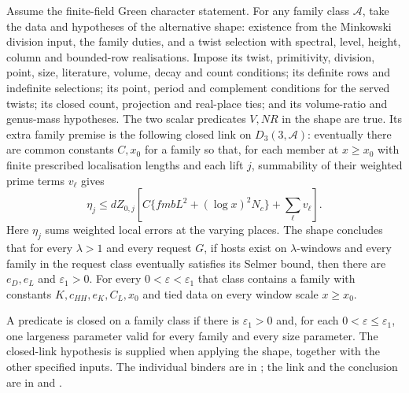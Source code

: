 \begin{formalstatement}\label{sub:B05}
Assume the finite-field Green character statement. For any family class
$\mathcal A$, take the data and hypotheses of the alternative shape:
existence from the Minkowski division input, the family duties, and a
twist selection with spectral, level, height, column and bounded-row
realisations. Impose its twist, primitivity, division, point, size,
literature, volume, decay and count conditions; its definite rows and
indefinite selections; its point, period and complement conditions for
the served twists; its closed count, projection and real-place ties;
and its volume-ratio and genus-mass hypotheses. The two scalar predicates
$V,NR$ in the shape are true. Its extra family premise is the following
closed link on $D_3(3,\mathcal A)$: eventually there are common constants
$C,x_0$ for a family so that, for each member at $x\ge x_0$ with finite
prescribed localisation lengths and each lift $j$, summability of their
weighted prime terms $v_\ell$ gives
\[
  \eta_j\le dZ_{0,j}\left[C\{fmbL^2+(\log x)^2N_c\}
                         +\sum_\ell v_\ell\right].
\]
Here $\eta_j$ sums weighted local errors at the varying places. The shape
concludes that for every $\lambda>1$ and every request $G$, if hosts exist
on $\lambda$-windows and every family in the request class eventually
satisfies its Selmer bound, then there are $e_D,e_L$ and $\varepsilon_1>0$.
For every $0<\varepsilon<\varepsilon_1$ that class contains a family
with constants $K,c_{HH},e_K,C_L,x_0$ and tied data on every window scale
$x\ge x_0$.
\end{formalstatement}
A predicate is closed on a family class if there is $\varepsilon_1>0$
and, for each $0<\varepsilon\le\varepsilon_1$, one largeness parameter
valid for every family and every size parameter. The closed-link hypothesis
is supplied when applying the shape, together with the other specified
inputs. The individual binders are in ;
the link and the conclusion are in 
and .
